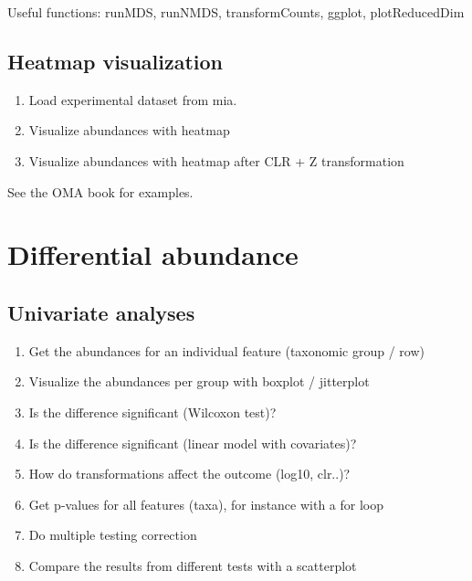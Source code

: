 \documentclass[
]{book}
\providecommand{\tightlist}{%
  \setlength{\itemsep}{0pt}\setlength{\parskip}{0pt}}
\begin{document}
Useful functions: runMDS, runNMDS, transformCounts, ggplot, plotReducedDim

\hypertarget{heatmap-visualization}{%
\subsection{Heatmap visualization}\label{heatmap-visualization}}

\begin{enumerate}
\def\labelenumi{\arabic{enumi}.}
\tightlist
\item
  Load experimental dataset from mia.
\item
  Visualize abundances with heatmap
\item
  Visualize abundances with heatmap after CLR + Z transformation
\end{enumerate}

See the OMA book for examples.

\hypertarget{differential-abundance-1}{%
\section{Differential abundance}\label{differential-abundance-1}}

\hypertarget{univariate-analyses}{%
\subsection{Univariate analyses}\label{univariate-analyses}}

\begin{enumerate}
\def\labelenumi{\arabic{enumi}.}
\tightlist
\item
  Get the abundances for an individual feature (taxonomic group / row)
\item
  Visualize the abundances per group with boxplot / jitterplot
\item
  Is the difference significant (Wilcoxon test)?
\item
  Is the difference significant (linear model with covariates)?
\item
  How do transformations affect the outcome (log10, clr..)?
\item
  Get p-values for all features (taxa), for instance with a for loop
\item
  Do multiple testing correction
\item
  Compare the results from different tests with a scatterplot
\end{enumerate}
\end{document}
